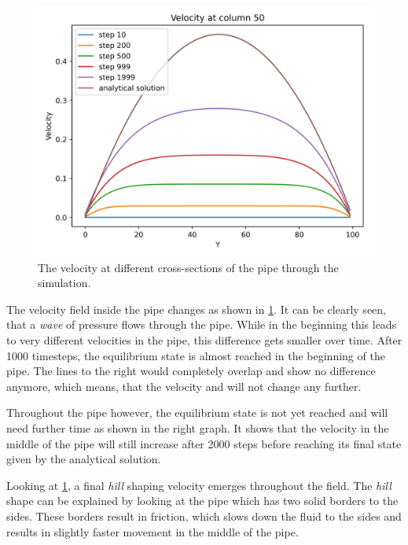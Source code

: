 \begin{figure}[H]
\begin{minipage}{0.33\textwidth}
        \includegraphics[width=\linewidth]{graphs/PoiseuilleFlow/velocity_for_step_at_columns_analytical}
    \end{minipage}
    \caption{
        The velocity at different cross-sections of the pipe through the simulation.
    }
    \label{fig:pf-velocity-areas}
\end{figure}

The velocity field inside the pipe changes as shown in \cref{fig:pf-velocity-areas}.
It can be clearly seen, that a \textit{wave} of pressure flows through the pipe.
While in the beginning this leads to very different velocities in the pipe, this difference gets smaller over time.
After 1000 timesteps, the equilibrium state is almost reached in the beginning of the pipe.
The lines to the right would completely overlap and show no difference anymore, which means, that the velocity and will not change any further.

Throughout the pipe however, the equilibrium state is not yet reached and will need further time as shown in the right graph.
It shows that the velocity in the middle of the pipe will still increase after 2000 steps before reaching its final state given by the analytical solution.
\pagebreak

Looking at \cref{fig:pf-velocity-areas}, a final \textit{hill} shaping velocity emerges throughout the field.
The \textit{hill} shape can be explained by looking at the pipe which has two solid borders to the sides.
These borders result in friction, which slows down the fluid to the sides and results in slightly faster movement in the middle of the pipe.

